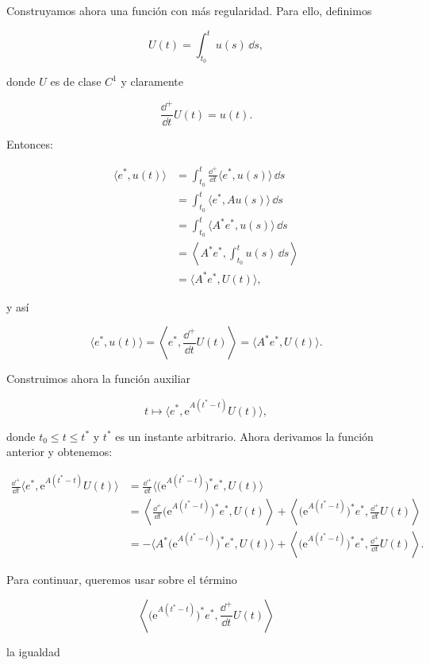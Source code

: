 Construyamos ahora una función con más regularidad. Para ello, definimos

\[U(t) = \int_{t_0}^t u(s) \, \dd s,\]

donde $U$ es de clase $C^1$ y claramente

\[\frac{\dd^+}{\dd t}U(t) = u(t).\]

Entonces:

\begin{align*}
    \langle e^*, u(t) \rangle &= \int_{t_0}^t \frac{\dd^+}{\dd t}\langle e^*, u(s)\rangle \, \dd s\\
    &= \int_{t_0}^t \langle e^*, Au(s)\rangle \, \dd s\\
    &= \int_{t_0}^t \langle A^*e^*, u(s)\rangle \, \dd s\\
    &= \left \langle A^*e^*, \int_{t_0}^t u(s) \, \dd s\right \rangle\\
    &= \langle A^*e^*, U(t) \rangle,
\end{align*}

y así

\[\langle e^*, u(t) \rangle = \left \langle e^*, \frac{\dd^+}{\dd t}U(t)\right \rangle = \langle A^*e^*, U(t) \rangle.\]

Construimos ahora la función auxiliar

\[t \mapsto \langle e^*, \mathrm{e}^{A(t^* - t)}U(t) \rangle,\]

donde $t_0 \leq t \leq t^*$ y $t^*$ es un instante arbitrario. Ahora derivamos la función anterior y obtenemos:

\begin{align*}
    \frac{\dd^+}{\dd t}\langle e^*, \mathrm{e}^{A(t^* - t)}U(t) \rangle &= \frac{\dd^+}{\dd t}\Big \langle \big (\mathrm{e}^{A(t^* - t)}\big)^*e^*, U(t) \Big\rangle\\
    &= \left \langle \frac{\dd^+}{\dd t} \big (\mathrm{e}^{A(t^* - t)}\big)^*e^*, U(t) \right\rangle + \left\langle \big (\mathrm{e}^{A(t^* - t)}\big)^*e^*, \frac{\dd^+}{\dd t}U(t) \right\rangle\\
    &= -\Big\langle A^*\big (\mathrm{e}^{A(t^* - t)}\big)^*e^*, U(t) \Big\rangle + \left\langle \big (\mathrm{e}^{A(t^* - t)}\big)^*e^*, \frac{\dd^+}{\dd t}U(t) \right\rangle.
\end{align*}

Para continuar, queremos usar sobre el término

\[\left\langle \big (\mathrm{e}^{A(t^* - t)}\big)^*e^*, \frac{\dd^+}{\dd t}U(t) \right\rangle\]

la igualdad

